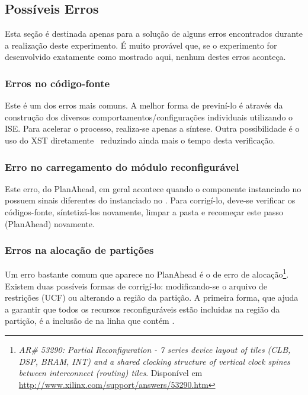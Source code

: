 \documentclass[11pt,a4paper,oneside]{book}
\begin{document}
\subsection{Possíveis Erros}
Esta seção é destinada apenas para a solução de alguns erros encontrados durante a realização deste experimento.
É muito provável que, se o experimento for desenvolvido exatamente como mostrado aqui, nenhum destes erros aconteça.

\subsubsection{Erros no código-fonte} Este é um dos erros mais comuns.
A melhor forma de previní-lo é através da construção dos diversos comportamentos/configurações individuais utilizando o ISE.
Para acelerar o processo, realiza-se apenas a síntese.
Outra possibilidade é o uso do XST diretamente \, reduzindo ainda mais o tempo desta verificação. 

\subsubsection{Erro no carregamento do módulo reconfigurável}
Este erro, do PlanAhead, em geral acontece quando o componente instanciado no  possuem sinais diferentes do instanciado no .
Para corrigí-lo, deve-se verificar os códigos-fonte, síntetizá-los novamente, limpar a pasta  e recomeçar este passo (PlanAhead) novamente.

\subsubsection{Erros na alocação de partições}
\label{par:alocacao}
Um erro bastante comum que aparece no PlanAhead é o de erro de alocação\footnote{\textit{AR\# 53290: Partial Reconfiguration - 7 series device layout of tiles (CLB, DSP, BRAM, INT) and a shared clocking structure of vertical clock spines between interconnect (routing) tiles}. Disponível em \url{http://www.xilinx.com/support/answers/53290.htm}}.
Existem duas possíveis formas de corrigí-lo: modificando-se o arquivo de restrições (UCF) ou alterando a região da partição.
A primeira forma, que ajuda a garantir que todos os recursos reconfiguráveis estão incluidas na região da partição, é a inclusão de  na linha que contém .
\end{document}
